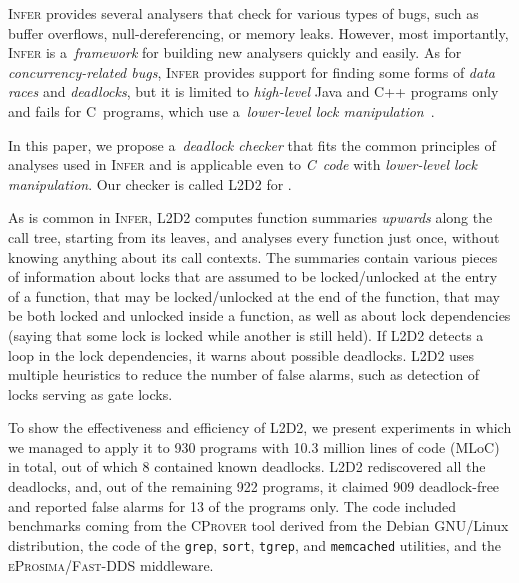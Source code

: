 \documentclass[runningheads]{llncs}
\newcommand{\LLDD}{\textsc{L2D2}\xspace} %
\newcommand{\Infer}{\textsc{Infer}\xspace}
\newcommand{\CProver}{\textsc{CProver}\xspace}
\newcommand{\grep}{\texttt{grep}\xspace}
\newcommand{\sort}{\texttt{sort}\xspace}
\newcommand{\tgrep}{\texttt{tgrep}\xspace}
\newcommand{\memcached}{\texttt{memcached}\xspace}
\newcommand{\DDS}{\textsc{Fast-DDS}\xspace}
\newcommand{\eprosimaDDS}{\textsc{eProsima/\DDS}\xspace}
\begin{document}
%

\Infer provides several analysers that check for various types of bugs, such as
buffer overflows, null-dereferencing, or memory leaks.  However, most
importantly, \Infer is a~\emph{framework} for building new analysers quickly and
easily. As for \emph{concurrency-related bugs}, \Infer provides support for
finding some forms of \emph{data races} and \emph{deadlocks}, but it is limited
to \emph{high-level} Java and C++ programs only and fails for C~programs, which
use a~\emph{lower-level lock manipulation}~\cite{racerD18,inferCACM19}.

In this paper, we propose a~\emph{deadlock checker} that fits the common
principles of analyses used in \Infer and is applicable even to \emph{C~code}
with \emph{lower-level lock manipulation}. Our checker is called \LLDD for
.

As is common in \Infer, \LLDD computes function summaries \emph{upwards} along
the call tree, starting from its leaves, and analyses every function just once,
without knowing anything about its call contexts.
%
The summaries contain various pieces of information about locks that are assumed
to be locked/unlocked at the entry of a function, that may be locked/unlocked at
the end of the function, that may be both locked and unlocked inside a function,
as well as about lock dependencies (saying that some lock is locked while
another is still held).
%
If \LLDD detects a loop in the lock dependencies, it warns about possible
deadlocks.
%
\LLDD uses multiple heuristics to reduce the number of false alarms, such as
detection of locks serving as gate locks.

To show the effectiveness and efficiency of \LLDD, we present experiments in
which we managed to apply it to 930 programs with 10.3 million lines of code
(MLoC) in total, out of which 8 contained known deadlocks.
%
\LLDD rediscovered all the deadlocks, and, out of the remaining 922 programs, it
claimed 909 deadlock-free and reported false alarms for 13 of the programs only.
%
The code included benchmarks coming from the \CProver tool derived from the
Debian GNU/Linux distribution, the code of the \grep, \sort, \tgrep, and
\memcached utilities, and the \eprosimaDDS middleware.
\end{document}

